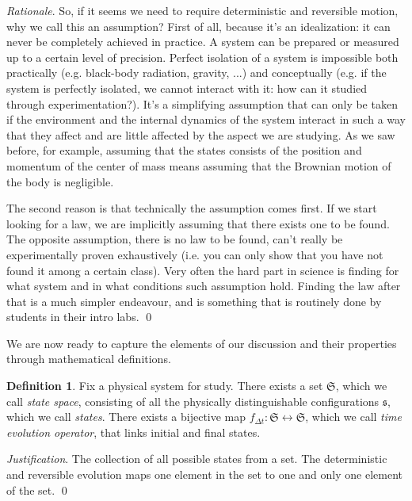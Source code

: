 \documentclass[aps,pra,10pt,twocolumn,floatfix,nofootinbib]{revtex4-1}
\theoremstyle{definition}
\newtheorem{defn}[prop]{Definition}
\newenvironment{rationale}{\emph{Rationale}.}{\qed}
\newenvironment{justification}{\emph{Justification}.}{\qed}
\begin{document}
\begin{rationale}
So, if it seems we need to require deterministic and reversible motion, why we call this an assumption? First of all, because it's an idealization: it can never be completely achieved in practice. A system can be prepared or measured up to a certain level of precision. Perfect isolation of a system is impossible both practically (e.g. black-body radiation, gravity, ...) and conceptually (e.g. if the system is perfectly isolated, we cannot interact with it: how can it studied through experimentation?). It's a simplifying assumption that can only be taken if the environment and the internal dynamics of the system interact in such a way that they affect and are little affected by the aspect we are studying. As we saw before, for example, assuming that the states consists of the position and momentum of the center of mass means assuming that the Brownian motion of the body is negligible.

The second reason is that technically the assumption comes first. If we start looking for a law, we are implicitly assuming that there exists one to be found. The opposite assumption, there is no law to be found, can't really be experimentally proven exhaustively (i.e. you can only show that you have not found it among a certain class). Very often the hard part in science is finding for what system and in what conditions such assumption hold. Finding the law after that is a much simpler endeavour, and is something that is routinely done by students in their intro labs.
\end{rationale}

We are now ready to capture the elements of our discussion and their properties through mathematical definitions.

\begin{defn}\label{statedef}
Fix a physical system for study. There exists a set $\mathfrak{S}$, which we call \emph{state space}, consisting of all the physically distinguishable configurations $\mathfrak{s}$, which we call \emph{states}. There exists a bijective map $f_{\Delta t}:\mathfrak{S} \leftrightarrow \mathfrak{S}$, which we call \emph{time evolution operator}, that links initial and final states.
\end{defn}

\begin{justification}
The collection of all possible states from a set. The deterministic and reversible evolution maps one element in the set to one and only one element of the set.
\end{justification}
\end{document}
